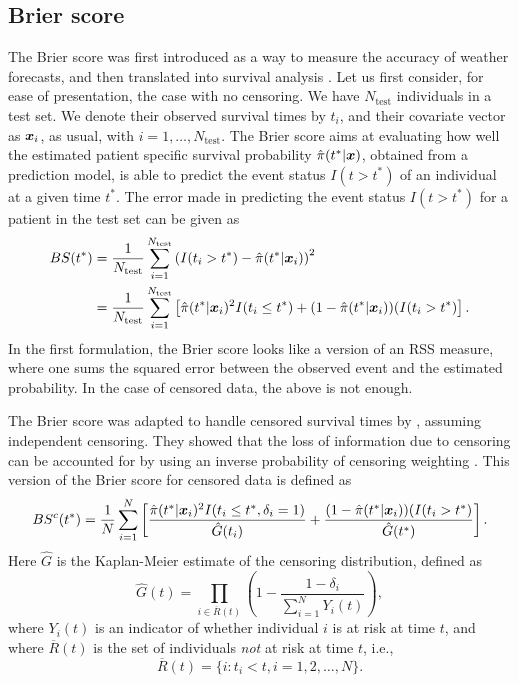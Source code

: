\subsection{Brier score}
The Brier score \citep{brier1950} was first introduced as a way to measure the accuracy of weather forecasts, and then translated into survival analysis \citep{graf}.
Let us first consider, for ease of presentation, the case with no censoring.
We have $N_{\text{test}}$ individuals in a test set.
We denote their observed survival times by $t_i$, and their covariate vector as $\bm{x}_i$, as usual, with $i=1,\ldots,N_{\text{test}}$. The Brier score aims at evaluating how well the estimated patient specific survival probability $\hat{\pi}(t^*|\bm{x})$, obtained from a prediction model, is able to predict the event status $I(t>t^*)$ of an individual at a given time $t^*$.
The error made in predicting the event status $I(t>t^*)$ for a patient in the test set can be given as
\begin{align*}
BS(t^*)&=\frac{1}{N_{\text{test}}}\sum_{i=1}^{N_{\text{test}}}\left(I(t_i>t^*)-\hat{\pi}(t^*|\bm{x}_i)\right)^2 \\
    &=\frac{1}{N_{\text{test}}}\sum_{i=1}^{N_{\text{test}}}\left[\hat{\pi}(t^*|\bm{x}_i)^2I(t_i\leq t^*)+(1-\hat{\pi}(t^*|\bm{x}_i))(I(t_i>t^*)\right].
\end{align*}
In the first formulation, the Brier score looks like a version of an RSS measure, where one sums the squared error between the observed event and the estimated probability.
In the case of censored data, the above is not enough.

The Brier score was adapted to handle censored survival times by \citet{graf}, assuming independent censoring.
They showed that the loss of information due to censoring can be accounted for by using an inverse probability of censoring weighting \citep{bovelstadborgan}.
This version of the Brier score for censored data is defined as
\begin{equation*}
    BS^c(t^*)=\frac{1}{N}\sum_{i=1}^N\left[\frac{\hat{\pi}(t^*|\bm{x}_i)^2I(t_i\leq t^*,\delta_i=1)}{\hat{G}(t_i)}+\frac{(1-\hat{\pi}(t^*|\bm{x}_i))(I(t_i>t^*)}{\hat{G}(t^*)}\right].
\end{equation*}
Here $\hat{G}$ is the Kaplan-Meier estimate of the censoring distribution, defined as
\begin{equation*}
    \hat{G}(t)=\prod_{i\in \overline{R}(t)}\left(1-\frac{1-\delta_i}{\sum_{i=1}^NY_i(t)}\right),
\end{equation*}
where $Y_i(t)$ is an indicator of whether individual $i$ is at risk at time $t$, and where $\overline{R}(t)$ is the set of individuals \textit{not} at risk at time $t$, i.e.,
\begin{equation*}
    \overline{R}(t)=\{i\colon t_i<t,i=1,2,\ldots,N\}.
\end{equation*}

